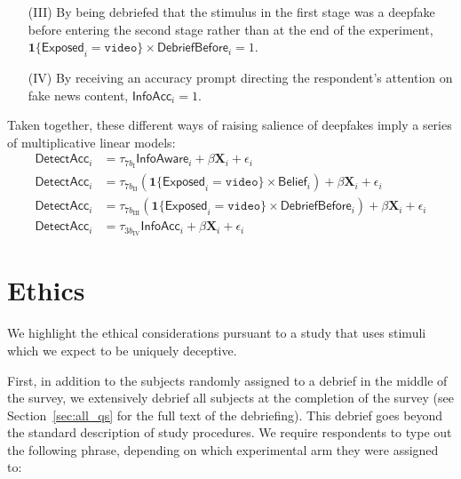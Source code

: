 \documentclass[12pt,letterpaper]{article}
\begin{document}
\begin{enumerate}
    \item[(III)] By being debriefed that the stimulus in the first stage was a deepfake before entering the second stage rather than at the end of the experiment, $\mathbf{1}\{\textsf{Exposed}_i = \texttt{video} \} \times \textsf{DebriefBefore}_i = 1$.
    \item[(IV)] By receiving an accuracy prompt directing the respondent's attention on fake news content, $\textsf{InfoAcc}_i = 1$.
\end{enumerate}

\noindent Taken together, these different ways of raising salience of deepfakes imply a series of multiplicative linear models:
\begin{align}
    \textsf{DetectAcc}_i & = \tau_{7b_{\text{I}}} \textsf{InfoAware}_i + \beta \mathbf{X}_i + \epsilon_i \\
    \textsf{DetectAcc}_i & = \tau_{7b_{\text{II}}} (\mathbf{1}\{\textsf{Exposed}_i = \texttt{video} \} \times \textsf{Belief}_i) + \beta \mathbf{X}_i + \epsilon_i \\
    \textsf{DetectAcc}_i & = \tau_{7b_{\text{III}}} (\mathbf{1}\{\textsf{Exposed}_i = \texttt{video} \} \times \textsf{DebriefBefore}_i) + \beta \mathbf{X}_i + \epsilon_i \\
    \textsf{DetectAcc}_i & = \tau_{3b_{\text{IV}}}\textsf{InfoAcc}_i  + \beta \mathbf{X}_i + \epsilon_i
\end{align}



\section{Ethics}\label{sec:debrief}


We highlight the ethical considerations pursuant to a study that uses stimuli which we expect to be uniquely deceptive. 

First, in addition to the subjects randomly assigned to a debrief in the middle of the survey, we extensively debrief all subjects at the completion of the survey (see Section~\ref{sec:all_qs} for the full text of the debriefing). This debrief goes beyond the standard description of study procedures. We require respondents to type out the following phrase, depending on which experimental arm they were assigned to:
\begin{framed}
\end{framed}
\end{document}
